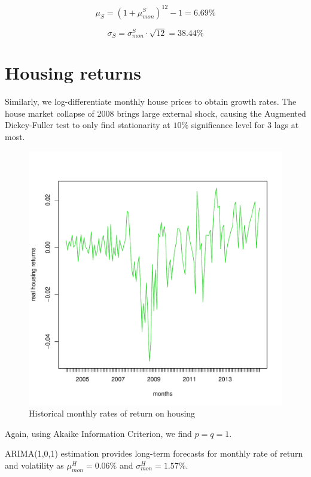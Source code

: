 \begin{equation}
	\mu_S = (1 + \mu^S_{mon})^{12} - 1= 6.69\%
\end{equation}

\begin{equation}
	\sigma_S = \sigma^S_{mon} \cdot \sqrt{12} = 38.44\%
\end{equation}

\section{Housing returns}
\label{paramcaliby}
Similarly, we log-differentiate monthly house prices to obtain growth rates. The house market collapse of 2008 brings large external shock, causing the Augmented Dickey-Fuller test to only find stationarity at $10\%$ significance level for 3 lags at most.

\begin{figure}[h!]
	\centering
	\includegraphics[scale=0.3]{figs/reidindiff.pdf}
	\caption{Historical monthly rates of return on housing}
	\label{fig:reidindiff}
\end{figure}

Again, using Akaike Information Criterion, we find $p=q=1$.

ARIMA(1,0,1) estimation provides long-term forecasts for monthly rate of return and volatility as $\mu^H_{mon} = 0.06\%$ and $\sigma^H_{mon} = 1.57\%$.


